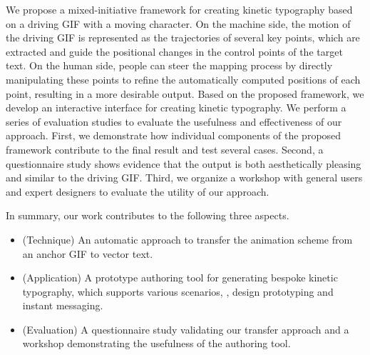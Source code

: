 We propose a mixed-initiative framework for creating kinetic typography based on a driving GIF with a moving character.
On the machine side, the motion of the driving GIF is represented as the trajectories of several key points, which are extracted and guide the positional changes in the control points of the target text.
 On the human side, people can steer the mapping process by directly manipulating these points to refine the automatically computed positions of each point, resulting in a more desirable output.
 Based on the proposed framework, we develop an interactive interface for creating kinetic typography.
 We perform a series of evaluation studies to evaluate the usefulness and effectiveness of our approach.
 First, we demonstrate how individual components of the proposed framework contribute to the final result and test several cases.
 Second, a questionnaire study shows evidence that the output is both aesthetically pleasing and similar to the driving GIF.
 Third, we organize a workshop with general users and expert designers to evaluate the utility of our approach.




In summary, our work contributes to the following three aspects.
\begin{itemize}[leftmargin=2.2em]
    \item (Technique) An automatic approach to transfer the animation scheme from an anchor GIF to vector text.
    \item (Application) A prototype authoring tool for generating bespoke kinetic typography, which supports various scenarios, \eg, design prototyping and instant messaging.
    \item (Evaluation) A questionnaire study validating our transfer approach and a workshop demonstrating the usefulness of the authoring tool.
\end{itemize}